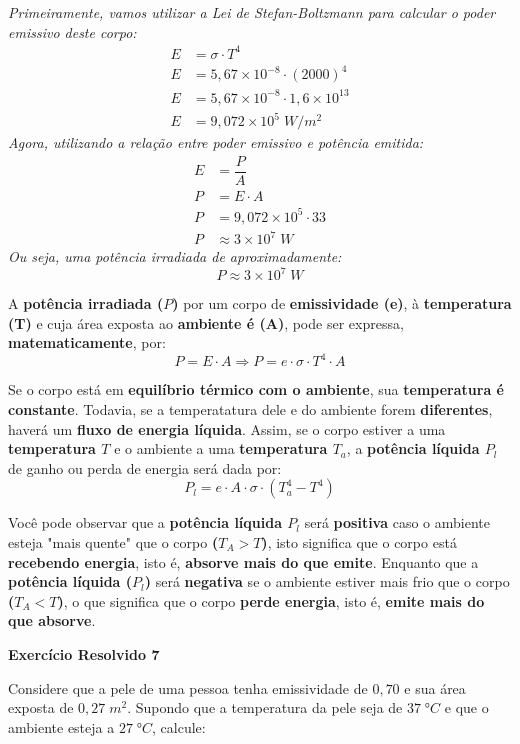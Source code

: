 \documentclass[12pt,twoside]{article}
\newenvironment{resposta*}
{\bf Resposta:\\ }
{}
\begin{document}
\begin{resposta*}
{\it Primeiramente, vamos utilizar a Lei de Stefan-Boltzmann para calcular o poder emissivo deste corpo:
\begin{align*}
E &= \sigma \cdot T^{4} \\
E &= 5,67\times 10^{-8} \cdot (2000)^{4} \\
E &= 5,67\times 10^{-8} \cdot 1,6\times 10^{13} \\
E &= 9,072\times 10^{5} \; W/m^{2}
\end{align*}
Agora, utilizando a relação entre poder emissivo e potência emitida:
\begin{align*}
E &= \dfrac{P}{A} \\
P &= E\cdot A \\
P &= 9,072\times 10^{5} \cdot 33 \\
P &\approx 3\times 10^{7}\;W
\end{align*}
Ou seja, uma potência irradiada de aproximadamente: \[\boxed{P \approx 3\times 10^{7}\;W}\]}
\end{resposta*}

A \textbf{potência irradiada ($P$)} por um corpo de \textbf{emissividade (e)}, à \textbf{temperatura (T)} e cuja área exposta ao \textbf{ambiente é (A)}, pode ser expressa, \textbf{matematicamente}, por: \[P=E\cdot A \Rightarrow \boxed{P=e\cdot \sigma \cdot T^{4} \cdot A}\]


Se o corpo está em \textbf{equilíbrio térmico com o ambiente}, sua \textbf{temperatura é constante}. Todavia, se a temperatatura dele e do ambiente forem \textbf{diferentes}, haverá um \textbf{fluxo de energia líquida}. Assim, se o corpo estiver a uma \textbf{temperatura $T$} e o ambiente a uma \textbf{temperatura $T_{a}$}, a \textbf{potência líquida $P_{l}$} de ganho ou perda de energia será dada por: \[\boxed{P_{l} = e \cdot A \cdot \sigma \cdot (T_{a}^{4} - T^{4})}\]


Você pode observar que a \textbf{potência líquida $P_{l}$} será \textbf{positiva} caso o ambiente esteja "mais quente" que o corpo \textbf{($T_{A} > T$)}, isto significa que o corpo está \textbf{recebendo energia}, isto é, \textbf{absorve mais do que emite}. Enquanto que a \textbf{potência líquida ($P_{l}$)} será \textbf{negativa} se o ambiente estiver mais frio que o corpo \textbf{($T_{A} < T$)}, o que significa que o corpo \textbf{perde energia}, isto é, \textbf{emite mais do que absorve}.


\textbf{Exercício Resolvido 7}


Considere que a pele de uma pessoa tenha emissividade de $0,70$ e sua área exposta de $0,27\;m^{2}$. Supondo que a temperatura da pele seja de $37\;°C$ e que o ambiente esteja a $27\;°C$, calcule:
\end{document}
